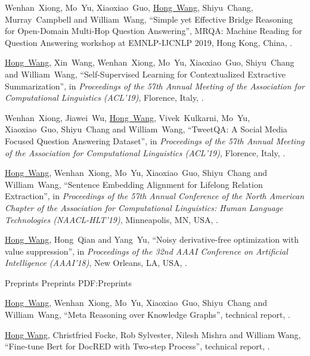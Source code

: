 \documentclass[letterpaper,MMMyyyy,nonstopmode]{simpleresumecv}
\begin{document}
\begin{Body}
\begin{enumerate}[label={[\arabic*]~~}]
\item
Wenhan~Xiong, Mo~Yu, Xiaoxiao~Guo, \underline{Hong~Wang}, Shiyu~Chang, Murray~Campbell and William~Wang,
``Simple yet Effective Bridge Reasoning for Open-Domain Multi-Hop Question Answering'',
MRQA: Machine Reading for Question Answering workshop at EMNLP-IJCNLP 2019, Hong Kong, China,
.

\item
\underline{Hong~Wang}, Xin~Wang, Wenhan~Xiong, Mo~Yu, Xiaoxiao~Guo, Shiyu~Chang and William~Wang,
``Self-Supervised Learning for Contextualized Extractive Summarization'',
in \textit{Proceedings of the 57th Annual Meeting of the Association for Computational Linguistics (ACL'19)},
Florence, Italy,
.

\item
Wenhan~Xiong, Jiawei~Wu, \underline{Hong~Wang}, Vivek~Kulkarni, Mo~Yu, Xiaoxiao~Guo, Shiyu~Chang and William~Wang,
``TweetQA: A Social Media Focused Question Answering Dataset'',
in \textit{Proceedings of the 57th Annual Meeting of the Association for Computational Linguistics (ACL'19)},
Florence, Italy,
.

\item
\underline{Hong~Wang}, Wenhan~Xiong, Mo~Yu, Xiaoxiao~Guo, Shiyu~Chang and William~Wang,
``Sentence Embedding Alignment for Lifelong Relation Extraction'',
in \textit{Proceedings of the 57th Annual Conference of the North American Chapter of the Association for Computational Linguistics: Human Language Technologies (NAACL-HLT'19)},
Minneapolis, MN, USA,
.

\item
\underline{Hong~Wang}, Hong~Qian and Yang~Yu,
``Noisy derivative-free optimization with value suppression'',
in \textit{Proceedings of the 32nd AAAI Conference on Artificial Intelligence (AAAI’18)},
New Orleans, LA, USA,
.

\end{enumerate}

\BigGap
\SubSection
{Preprints}
{Preprints}
{PDF:Preprints}
\begin{enumerate}[label={[\arabic*]~~}]
\item
\underline{Hong~Wang}, Wenhan~Xiong, Mo~Yu, Xiaoxiao~Guo, Shiyu~Chang and William~Wang,
``Meta Reasoning over Knowledge Graphs'',
technical report,
.

\item
\underline{Hong Wang}, Christfried Focke, Rob Sylvester, Nilesh Mishra and William Wang,
``Fine-tune Bert for DocRED with Two-step Process'',
technical report,
.


\end{enumerate}
\end{Body}
\end{document}
